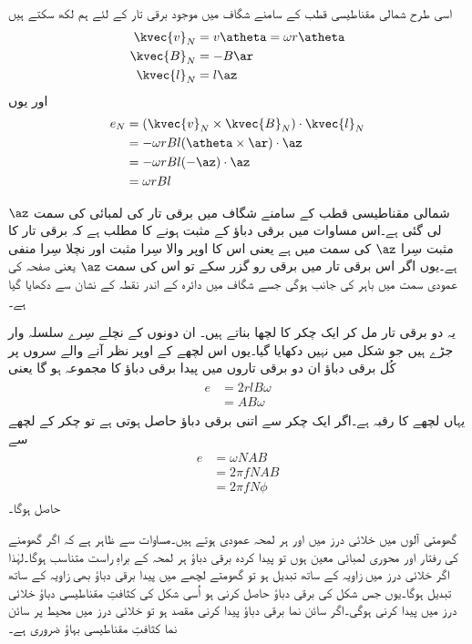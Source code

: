 اسی طرح شمالی مقناطیسی قطب کے سامنے شگاف میں موجود برقی تار کے لئے ہم لکھ سکتے ہیں
\begin{gather}
\begin{aligned}
\kvec{v}_N&=v \atheta=\omega r \atheta\\
\kvec{B}_N&=-B \ar\\
\kvec{l}_N&=l \az
\end{aligned}
\end{gather}
اور یوں 
\begin{gather}
\begin{aligned}
e_N&=(\kvec{v}_N \times \kvec{B}_N)\cdot \kvec{l}_N\\
&=-\omega r B l (\atheta \times \ar) \cdot \az\\
&=-\omega r B l (-\az) \cdot \az\\
&=\omega r B l 
\end{aligned}
\end{gather}

شمالی مقناطیسی قطب کے سامنے شگاف میں برقی تار کی لمبائی کی سمت $\az$ لی گئی ہے۔اس مساوات میں برقی دباؤ کے مثبت ہونے کا مطلب ہے کہ برقی تار کا مثبت سِرا $\az$ کی سمت میں ہے یعنی اس کا اوپر والا سِرا مثبت اور نچلا  سِرا منفی ہے۔یوں اگر اس برقی تار میں برقی رو گزر سکے تو اس کی سمت $\az$ یعنی صفحہ کی عمودی سمت میں باہر کی جانب ہوگی جسے شگاف میں دائرہ کے اندر نقطہ کے نشان سے دکھایا گیا ہے۔ 

یہ دو برقی تار مل کر ایک چکر کا لچھا بناتے ہیں۔ ان دونوں کے نچلے سِرے سلسلہ وار جڑے ہیں جو شکل میں نہیں دکھایا گیا۔یوں اس لچھے کے اوپر نظر آنے والے سروں پر کُل برقی دباؤ  ان دو برقی تاروں میں پیدا برقی دباؤ  کا مجموعہ ہو گا یعنی
\begin{gather}
\begin{aligned}
e&=2r l B \omega\\
&=A B \omega
\end{aligned}
\end{gather}
یہاں لچھے کا رقبہ   ہے۔اگر ایک چکر سے اتنی برقی دباؤ حاصل ہوتی ہے تو  چکر کے لچھے  سے
\begin{gather}
\begin{aligned}
e&=\omega N A B\\
&=2 \pi f N A B\\
&=2 \pi f N \phi
\end{aligned}
\end{gather}
حاصل ہوگا۔

گھومتی آلوں میں خلائی درز میں   اور   ہر لمحہ عمودی ہوتے ہیں۔مساوات  سے ظاہر ہے کہ اگر گھومنے کی رفتار اور محوری لمبائی معین ہوں تو پیدا کردہ برقی دباؤ  ہر لمحہ   کے براہِ راست متناسب ہوگا۔لہٰذا اگر خلائی درز میں زاویہ کے ساتھ   تبدیل ہو تو گھومتے لچھے میں پیدا برقی دباؤ بھی زاویہ کے ساتھ تبدیل ہوگا۔یوں جس شکل کی برقی دباؤ حاصل کرنی ہو اُسی شکل کی کثافتِ مقناطیسی دباؤ خلائی درز میں پیدا کرنی ہوگی۔اگر سائن نما برقی دباؤ پیدا کرنی مقصد ہو تو خلائی درز میں محیط پر سائن نما کثافتِ مقناطیسی بہاؤ ضروری ہے۔

